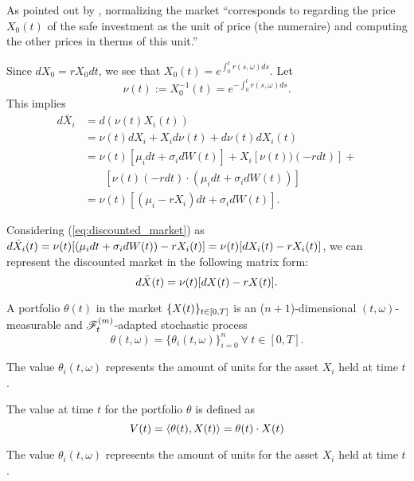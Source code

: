 \documentclass[../TGMAFFIRO.tex]{subfiles}
\begin{document}
As pointed out by , normalizing the market ``corresponds to regarding the price $X_0(t)$ of the safe investment as the unit of price (the numeraire) and computing the other prices in therms of this unit.''

\begin{remark}
	Since $dX_0 = r X_0 dt$, we see that $X_0(t) = e^{\int_0^tr(s,\omega) ds}$. Let
	\begin{equation}
		\nu(t) := X^{-1}_0(t) = e^{-\int_0^tr(s,\omega) ds}.
	\end{equation}
This implies
\begin{align}
	d\bar X_i &= d\left(\nu(t)X_i(t)\right) \nonumber \\
			&= \nu(t)dX_i + X_id\nu(t) + d\nu(t)dX_i(t)\nonumber\\
			&= \nu(t) [\mu_i dt + \sigma_i dW(t)] + X_i[\nu(t))(-r dt)] + \nonumber\\
			&\phantom{{}=1} [\nu(t)(-r dt)\cdot(\mu_i dt + \sigma_i dW(t))]\nonumber\\
			&=\nu(t)[(\mu_i - r X_i)dt + \sigma_i dW(t)] \label{eq:discounted_market}.
\end{align}

Considering (\ref{eq:discounted_market}) as $d\bar{X}_i(t) = \nu(t)[(\mu_i dt + \sigma_i dW(t)) - r X_i(t)] = \nu(t)[dX_i(t) - r X_i(t)]$, we can represent the discounted market in the following matrix form:
\begin{equation}
  d\bar{X}(t) = \nu(t)[dX(t) - r X(t)]. \label{eq:discounted_market_matrix}
\end{equation}

\end{remark}

\begin{definition}
	A portfolio $\theta(t)$ in the market $\{X(t)\}_{t\in[0,T]}$ is an ($n+1$)-dimensional $(t,\omega)$-measurable and $\mathscr{F}_t^{(m)}$-adapted stochastic process
	\begin{equation}
		\theta(t,\omega) = \{\theta_{i}(t,\omega)\}_{i=0}^{n} \ \forall \ t\in[0, T].
	\end{equation}
\end{definition}

The value $\theta_i(t,\omega)$ represents the amount of units for the asset $X_i$ held at time $t$.

\begin{definition}
	The value at time $t$ for the portfolio $\theta$ is defined as
	\begin{equation}
		V(t) = \langle \theta(t), X(t)\rangle = \theta(t) \cdot X(t)
	\end{equation}
\end{definition}
The value $\theta_i(t,\omega)$ represents the amount of units for the asset $X_i$ held at time $t$.
\end{document}
